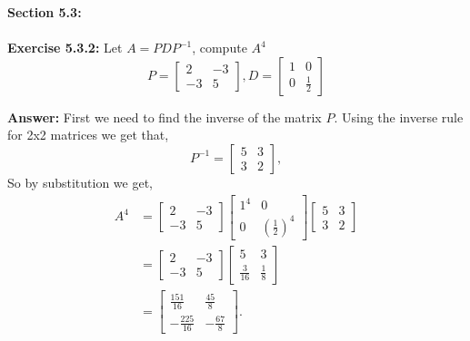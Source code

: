\documentclass{amsart}
\begin{document}
{\huge\textbf{Section 5.3:}}\\\\


\noindent\textbf{Exercise 5.3.2: } Let $A = PDP^{-1}$, compute $A^4$
\begin{equation*}
P = 
\begin{bmatrix}
2& - 3\\
 -3 & 5
\end{bmatrix},
D = 
\begin{bmatrix}
1&0\\
 0 & \frac{1}{2}
\end{bmatrix}
\end{equation*}

\noindent \textbf{Answer: } First we need to find the inverse of the matrix $P$. Using the  inverse rule for 2x2 matrices we get that,
\begin{equation*}
P^{-1} = 
\begin{bmatrix}
5& 3\\
 3 & 2
\end{bmatrix},
\end{equation*}
So by substitution we get,
\begin{align*}
A^4& = 
\begin{bmatrix}
2& - 3\\
 -3 & 5
\end{bmatrix}
\begin{bmatrix}
1^4&0\\
 0 & (\frac{1}{2})^4
\end{bmatrix}
\begin{bmatrix}
5& 3\\
 3 & 2
\end{bmatrix}\\
&=
\begin{bmatrix}
2& - 3\\
 -3 & 5
\end{bmatrix}
\begin{bmatrix}5&3\\ \frac{3}{16}&\frac{1}{8}\end{bmatrix}\\
&=
\begin{bmatrix}\frac{151}{16}&\frac{45}{8}\\ -\frac{225}{16}&-\frac{67}{8}\end{bmatrix}.
\end{align*}
\vspace{1in}
\end{document}
